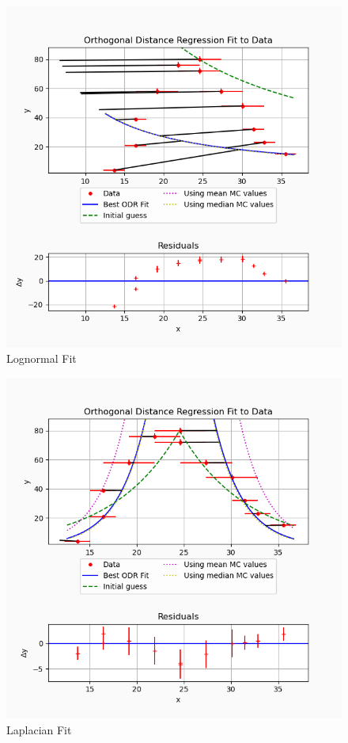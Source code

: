 \documentclass[12pt]{article}
\begin{document}
\begin{figure}\label{log}
    \includegraphics[width=\textwidth]{lognormal.png}
    \caption{Lognormal Fit}
\end{figure}

\begin{figure}\label{lap}
    \includegraphics[width=\textwidth]{laplacian.png}
    \caption{Laplacian Fit}
\end{figure}
\end{document}
